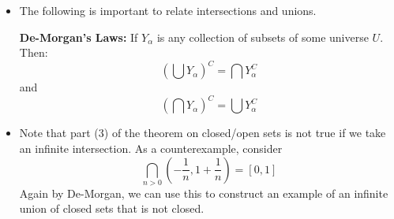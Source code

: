\begin{itemize}
\begin{proof}
\begin{enumerate}
                        We can do something similar for the second part. Suppose $B_i,\, i=1,\dots, n$ is closed. Then: 
                        \begin{equation}
                            \left(\bigcup_{i=1}\right)^C = \bigcap_{i=1}^n B_i^C
                        \end{equation}
                        We've shown that the right hand side is open, so $\bigcup_{i=1}$ must be closed.
              \end{enumerate}
          \end{proof}
          \item The following is important to relate intersections and unions.
          \begin{theorem}
              \textbf{De-Morgan's Laws:} If $Y_\alpha$ is any collection of subsets of some universe $U$. Then:
              \begin{equation}
                  \left(\bigcup Y_\alpha\right)^C = \bigcap Y_\alpha^C
              \end{equation}
              and
              \begin{equation}
                  \left(\bigcap Y_\alpha\right)^C = \bigcup Y_\alpha^C
              \end{equation}
          \end{theorem}
          \item Note that part (3) of the theorem on closed/open sets is not true if we take an infinite intersection. As a counterexample, consider 
          \begin{equation}
              \bigcap_{n>0} \left(-\frac{1}{n},1+\frac{1}{n}\right) = [0,1]
          \end{equation}
          Again by De-Morgan, we can use this to construct an example of an infinite union of closed sets that is not closed.
\end{itemize}
